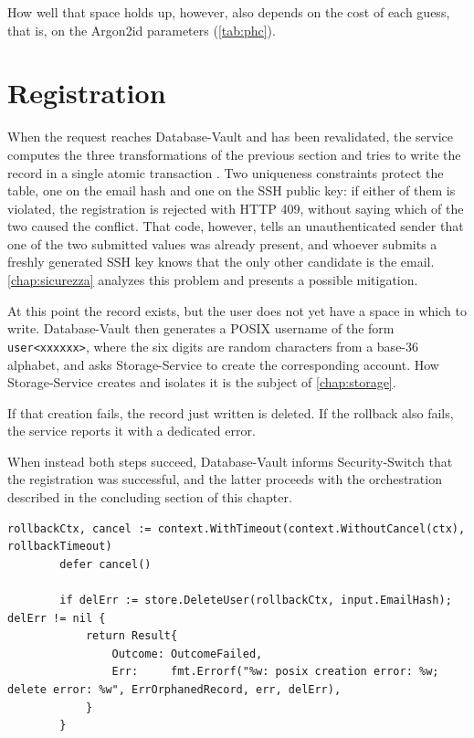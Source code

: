 How well that space holds up, however, also depends on the cost of each guess, that is, on the
Argon2id parameters (\autoref{tab:phc}).

\section{Registration}

When the request reaches Database-Vault and has been revalidated, the service computes the three
transformations of the previous section and tries to write the record in a single atomic
transaction \cite{ramusb-code-saveuser}. Two uniqueness constraints protect the table, one
on the email hash and one on the SSH public key: if either of them is violated, the registration
is rejected with HTTP 409, without saying which of the two caused the conflict. That code,
however, tells an unauthenticated sender that one of the two submitted values was
already present, and whoever submits a freshly generated SSH key knows that the only other candidate is the email.
\autoref{chap:sicurezza} analyzes this problem and presents a possible mitigation.

At this point the record exists, but the user does not yet have a space in which to write.
Database-Vault then generates a POSIX username of the form
\texttt{user<xxxxxx>}, where the six digits are random characters from a
base-36 alphabet, and asks Storage-Service to create the corresponding account. How
Storage-Service creates and isolates it is the subject of \autoref{chap:storage}.

If that creation fails, the record just written is deleted. If the rollback also fails,
the service reports it with a dedicated error.

When instead both steps succeed, Database-Vault informs Security-Switch that the
registration was successful, and the latter proceeds with the orchestration described
in the concluding section of this chapter.

\begin{lstlisting}[caption={Compensating rollback after a Storage-Service failure, from
\texttt{registration.go} \cite{ramusb-code-registration-rollback}.}, label={lst:rollback}]
		rollbackCtx, cancel := context.WithTimeout(context.WithoutCancel(ctx), rollbackTimeout)
		defer cancel()

		if delErr := store.DeleteUser(rollbackCtx, input.EmailHash); delErr != nil {
			return Result{
				Outcome: OutcomeFailed,
				Err:     fmt.Errorf("%w: posix creation error: %w; delete error: %w", ErrOrphanedRecord, err, delErr),
			}
		}
\end{lstlisting}

